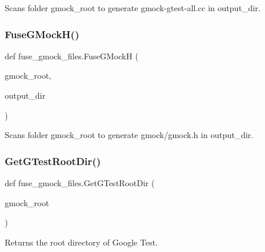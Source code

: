 \begin{DoxyVerb}Scans folder gmock_root to generate gmock-gtest-all.cc in output_dir.\end{DoxyVerb}
 \mbox{\label{namespacefuse__gmock__files_abab451606f671f59404f23276aad2c34}} 
\subsubsection{\texorpdfstring{Fuse\+G\+Mock\+H()}{FuseGMockH()}}
{\footnotesize\ttfamily def fuse\+\_\+gmock\+\_\+files.\+Fuse\+G\+MockH (\begin{DoxyParamCaption}\item[{}]{gmock\+\_\+root,  }\item[{}]{output\+\_\+dir }\end{DoxyParamCaption})}

\begin{DoxyVerb}Scans folder gmock_root to generate gmock/gmock.h in output_dir.\end{DoxyVerb}
 \mbox{\label{namespacefuse__gmock__files_aae591d77d2d969394996f9fc2017824c}} 
\subsubsection{\texorpdfstring{Get\+G\+Test\+Root\+Dir()}{GetGTestRootDir()}}
{\footnotesize\ttfamily def fuse\+\_\+gmock\+\_\+files.\+Get\+G\+Test\+Root\+Dir (\begin{DoxyParamCaption}\item[{}]{gmock\+\_\+root }\end{DoxyParamCaption})}

\begin{DoxyVerb}Returns the root directory of Google Test.\end{DoxyVerb}
 \mbox{\label{namespacefuse__gmock__files_a64e8cd1ead5a1454265cbc2d3db4d425}} 
